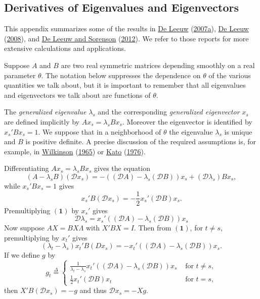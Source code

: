 \documentclass[
  12pt,
]{book}
\begin{document}
\hypertarget{derivatives-of-eigenvalues-and-eigenvectors}{%
\subsection{Derivatives of Eigenvalues and Eigenvectors}\label{derivatives-of-eigenvalues-and-eigenvectors}}

This appendix summarizes some of the results in \protect\hyperlink{ref-deleeuw_R_07c}{De Leeuw} (\protect\hyperlink{ref-deleeuw_R_07c}{2007a}), \protect\hyperlink{ref-deleeuw_R_08b}{De Leeuw} (\protect\hyperlink{ref-deleeuw_R_08b}{2008}), and \protect\hyperlink{ref-deleeuw_sorenson_U_12b}{De Leeuw and Sorenson} (\protect\hyperlink{ref-deleeuw_sorenson_U_12b}{2012}). We refer to those reports for more extensive calculations and applications.

Suppose \(A\) and \(B\) are two real symmetric matrices depending smoothly on a real parameter \(\theta\). The notation below suppresses the dependence on \(\theta\) of the various quantities we talk about, but it is important to remember that all eigenvalues and eigenvectors we talk about are functions of \(\theta\).

The \emph{generalized eigenvalue} \(\lambda_s\) and the corresponding \emph{generalized eigenvector} \(x_s\) are defined implicitly by \(Ax_s=\lambda_sBx_s\). Moreover the eigenvector is identified by \(x_s'Bx_s^{\ }=1\).
We suppose that in a neighborhood of \(\theta\) the eigenvalue \(\lambda_s\) is unique and \(B\) is positive definite. A precise discussion of the required assumptions is, for example, in \protect\hyperlink{ref-wilkinson_65}{Wilkinson} (\protect\hyperlink{ref-wilkinson_65}{1965}) or \protect\hyperlink{ref-kato_76}{Kato} (\protect\hyperlink{ref-kato_76}{1976}).

Differentiating \(Ax_s=\lambda_sBx_s\) gives the equation
\[
(A-\lambda_sB)(\mathcal{D}x_s)=-((\mathcal{D}A)-\lambda_s(\mathcal{D}B))x_s+(\mathcal{D}\lambda_s)Bx_s, \tag{1}
\]
while \(x_s'Bx_s=1\) gives
\[
x_s'B(\mathcal{D}x_s)=-\frac12 x_s'(\mathcal{D}B)x_s. \tag{2}
\]
Premultiplying \(\mathbf{(1)}\) by \(x_s'\) gives
\[
\mathcal{D}\lambda_s=x_s'((\mathcal{D}A)-\lambda_s(\mathcal{D}B))x_s
\]
Now suppose \(AX=BX\Lambda\) with \(X'BX=I\). Then from \(\mathbf{(1)}\), for \(t\not= s\), premultiplying by \(x_t'\) gives
\[
(\lambda_t-\lambda_s)x_t'B(Dx_s)=-x_t'((\mathcal{D}A)-\lambda_s(\mathcal{D}B))x_s.
\]
If we define \(g\) by
\[
g_t\mathop{=}\limits^{\Delta}\begin{cases}\frac{1}{\lambda_t-\lambda_s}x_t'((\mathcal{D}A)-\lambda_s(\mathcal{D}B))x_s&\text{ for }t\not= s,\\
\frac12 x_t'(\mathcal{D}B)x_t&\text{ for }t=s,
\end{cases}
\]
then \(X'B(\mathcal{D}x_s)=-g\) and thus \(\mathcal{D}x_s=-Xg\).
\end{document}
